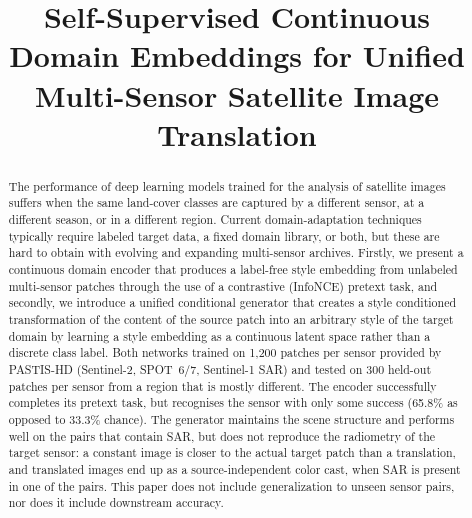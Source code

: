 \documentclass[conference]{IEEEtran}
\begin{document}
\title{Self-Supervised Continuous Domain Embeddings for Unified Multi-Sensor Satellite Image Translation}

\ifdefined\ANON
\author{
}
\else
\author{
}
\fi

\maketitle

\begin{abstract}
The performance of deep learning models trained for the analysis of satellite images suffers when the same land-cover classes are captured by a different sensor, at a different season, or in a different region. Current domain-adaptation techniques typically require labeled target data, a fixed domain library, or both, but these are hard to obtain with evolving and expanding multi-sensor archives. Firstly, we present a continuous domain encoder that produces a label-free style embedding from unlabeled multi-sensor patches through the use of a contrastive (InfoNCE) pretext task, and secondly, we introduce a unified conditional generator that creates a style conditioned transformation of the content of the source patch into an arbitrary style of the target domain by learning a style embedding as a continuous latent space rather than a discrete class label. Both networks trained on 1,200 patches per sensor provided by PASTIS-HD (Sentinel-2, SPOT~6/7, Sentinel-1 SAR) and tested on 300 held-out patches per sensor from a region that is mostly different. The encoder successfully completes its pretext task, but recognises the sensor with only some success (65.8\% as opposed to 33.3\% chance). The generator maintains the scene structure and performs well on the pairs that contain SAR, but does not reproduce the radiometry of the target sensor: a constant image is closer to the actual target patch than a translation, and translated images end up as a source-independent color cast, when SAR is present in one of the pairs. This paper does not include generalization to unseen sensor pairs, nor does it include downstream accuracy.
\end{abstract}
\end{document}
